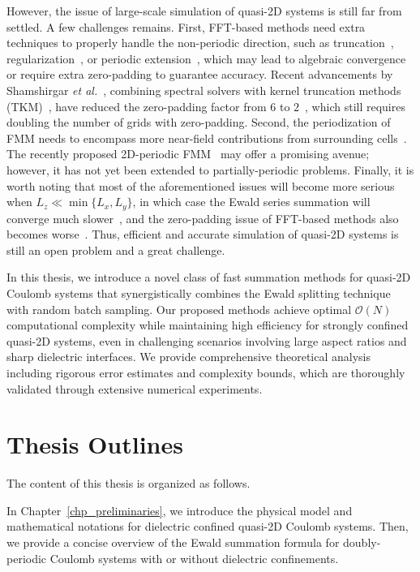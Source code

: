 However, the issue of large-scale simulation of quasi-2D systems is still far from settled.
A few challenges remains. First, FFT-based methods need extra techniques to properly handle the non-periodic direction, such as truncation~\cite{parry1975electrostatic}, regularization~\cite{nestler2015fast}, or periodic extension~\cite{lindbo2012fast}, which may lead to algebraic convergence or require extra zero-padding to guarantee accuracy. 
Recent advancements by Shamshirgar \emph{et al.}~\cite{shamshirgar2021fast}, combining spectral solvers with kernel truncation methods (TKM)~\cite{vico2016fast}, have reduced the zero-padding factor from $6$ to $2$~\cite{lindbo2012fast}, which still requires doubling the number of grids with zero-padding. 
Second, the periodization of FMM needs to encompass more near-field contributions from surrounding cells~\cite{yan2018flexibly,barnett2018unified}. The recently proposed 2D-periodic FMM~\cite{PEI2023111792} may offer a promising avenue; however, it has not yet been extended to partially-periodic problems.
Finally, it is worth noting that most of the aforementioned issues will become more serious when $L_z\ll \min\{L_x, L_y\}$, in which case the Ewald series summation will converge much slower~\cite{arnold2002electrostatics}, and the zero-padding issue of FFT-based methods also becomes worse~\cite{maxian2021fast}.
Thus, efficient and accurate simulation of quasi-2D systems is still an open problem and a great challenge.

In this thesis, we introduce a novel class of fast summation methods for quasi-2D Coulomb systems that synergistically combines the Ewald splitting technique with random batch sampling. 
Our proposed methods achieve optimal $\mathcal{O}(N)$ computational complexity while maintaining high efficiency for strongly confined quasi-2D systems, even in challenging scenarios involving large aspect ratios and sharp dielectric interfaces. 
We provide comprehensive theoretical analysis including rigorous error estimates and complexity bounds, which are thoroughly validated through extensive numerical experiments.

\section{Thesis Outlines}

The content of this thesis is organized as follows.

In Chapter~\ref{chp_preliminaries}, we introduce the physical model and mathematical notations for dielectric confined quasi-2D Coulomb systems.
Then, we provide a concise overview of the Ewald summation formula for doubly-periodic Coulomb systems with or without dielectric confinements.

